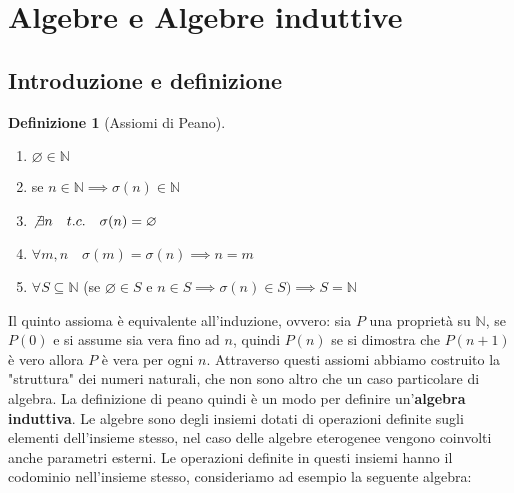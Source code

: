 \documentclass{article}
\theoremstyle{definition}
\theoremstyle{definition}
\theoremstyle{definition}
\newtheorem{definition}[theorem]{Definizione}
\theoremstyle{remark}
\begin{document}
\tableofcontents
\newpage
\section{Algebre e Algebre induttive}
\subsection{Introduzione e definizione}
\begin{definition}[Assiomi di Peano]
    \leavevmode\newline
    \begin{enumerate}
        \renewcommand{\labelenumi}{\Roman{enumi}.}
        \item $\varnothing  \in \mathbb{N}$
        \item  se $n\in\mathbb{N}\implies \sigma(n)\in\mathbb{N}$
        \item $\not\exists n\quad t.c.\quad \sigma(n)= \varnothing$
        \item $\forall m,n \quad \sigma(m)=\sigma(n)\implies n = m$
        \item $\forall S\subseteq \mathbb{N}$ (se $\varnothing \in S$ e $n\in S \implies \sigma(n)\in S)\implies S=\mathbb{N}$
    \end{enumerate}
\end{definition}
Il quinto assioma è equivalente all'induzione, ovvero: sia $P$ una proprietà su $\mathbb{N}$, se $P(0)$ e si assume sia vera fino ad $n$, quindi
$P(n)$ se si dimostra che $P(n+1)$ è vero allora $P$ è vera per ogni $n$. Attraverso questi assiomi abbiamo costruito la "struttura" dei numeri naturali, che non sono altro
che un caso particolare di algebra.
La definizione di peano quindi è un modo per definire un'\textbf{algebra induttiva}. Le algebre sono degli insiemi dotati di operazioni
definite sugli elementi dell'insieme stesso, nel caso delle algebre eterogenee vengono coinvolti anche parametri esterni. Le operazioni definite in questi insiemi
hanno il codominio nell'insieme stesso, consideriamo ad esempio la seguente algebra:
\end{document}
